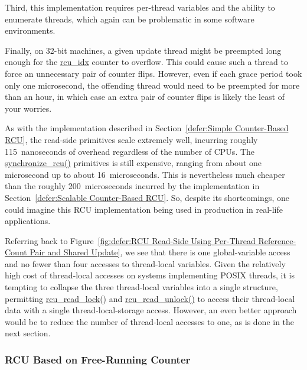 Third, this implementation requires per-thread variables
and the ability to enumerate threads, which again can be
problematic in some software environments.

Finally, on 32-bit machines, a given update thread might be
preempted long enough for the \url{rcu_idx}
counter to overflow.
This could cause such a thread to force an unnecessary
pair of counter flips.
However, even if each grace period took only one
microsecond, the offending thread would need to be
preempted for more than an hour, in which case an
extra pair of counter flips is likely the least of
your worries.

As with the implementation described in
Section~\ref{defer:Simple Counter-Based RCU},
the read-side primitives scale extremely well, incurring roughly
115~nanoseconds of overhead regardless of the number of CPUs.
The \url{synchronize_rcu()} primitives is still expensive,
ranging from about one microsecond up to about 16~microseconds.
This is nevertheless much cheaper than the roughly 200~microseconds
incurred by the implementation in
Section~\ref{defer:Scalable Counter-Based RCU}.
So, despite its shortcomings, one could imagine this
RCU implementation being used in production in real-life applications.

 \QuickQuizEnd

Referring back to
Figure~\ref{fig:defer:RCU Read-Side Using Per-Thread Reference-Count Pair and Shared Update},
we see that there is one global-variable access and no fewer than four
accesses to thread-local variables.
Given the relatively high cost of thread-local accesses on systems
implementing POSIX threads, it is tempting to collapse the three
thread-local variables into a single structure, permitting
\url{rcu_read_lock()} and \url{rcu_read_unlock()} to access their
thread-local data with a single thread-local-storage access.
However, an even better approach would be to reduce the number of
thread-local accesses to one, as is done in the next section.

\subsubsection{RCU Based on Free-Running Counter}
\label{defer:RCU Based on Free-Running Counter}

